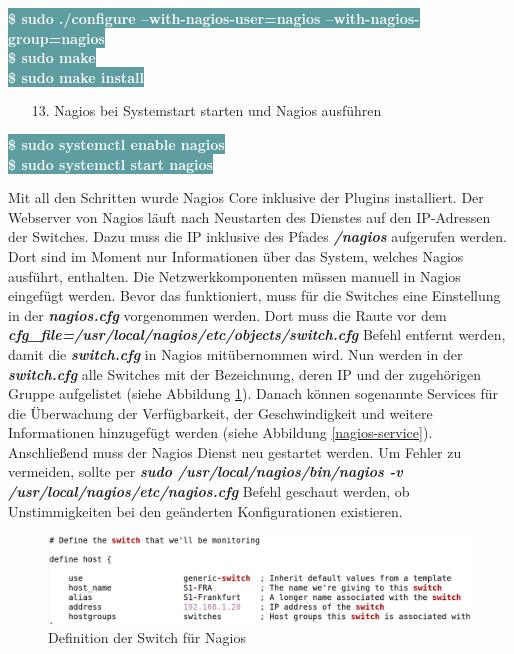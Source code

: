 \documentclass[fontsize=12pt,paper=a4,open=any,parskip=half,
  twoside=false,toc=listof,toc=bibliography,fleqn,leqno,
  captions=nooneline,captions=tableabove,british]{scrbook}
\begin{document}
\colorbox{CadetBlue}{\textcolor{white}{\textbf{\textsf{\$ sudo ./configure --with-nagios-user=nagios --with-nagios-group=nagios}}}}\\
\colorbox{CadetBlue}{\textcolor{white}{\textbf{\textsf{\$ sudo make}}}}\\
\colorbox{CadetBlue}{\textcolor{white}{\textbf{\textsf{\$ sudo make install}}}}
\begin{itemize}
\item[13.] Nagios bei Systemstart starten und Nagios ausführen
\end{itemize}
\colorbox{CadetBlue}{\textcolor{white}{\textbf{\textsf{\$ sudo systemctl enable nagios}}}}\\
\colorbox{CadetBlue}{\textcolor{white}{\textbf{\textsf{\$ sudo systemctl start nagios}}}}


Mit all den Schritten wurde Nagios Core inklusive der Plugins installiert. Der Webserver von Nagios läuft nach Neustarten des Dienstes auf den IP-Adressen der Switches. Dazu muss die IP inklusive des Pfades \textit{\textbf{/nagios}} aufgerufen werden. Dort sind im Moment nur Informationen über das System, welches Nagios ausführt, enthalten. Die Netzwerkkomponenten müssen manuell in Nagios eingefügt werden. Bevor das funktioniert, muss für die Switches eine Einstellung in der \textit{\textbf{nagios.cfg}} vorgenommen werden. Dort muss die Raute vor dem \textit{\textbf{cfg\_file=/usr/local/nagios/etc/objects/switch.cfg}} Befehl entfernt werden, damit die \textit{\textbf{switch.cfg}} in Nagios mitübernommen wird. Nun werden in der \textit{\textbf{switch.cfg}} alle Switches mit der Bezeichnung, deren IP und der zugehörigen Gruppe aufgelistet (siehe Abbildung \ref{nagios-switch}). Danach können sogenannte Services für die Überwachung der Verfügbarkeit, der Geschwindigkeit und weitere Informationen hinzugefügt werden (siehe Abbildung \ref{nagios-service}). Anschließend muss der Nagios Dienst neu gestartet werden. Um Fehler zu vermeiden, sollte per \textit{\textbf{sudo /usr/local/nagios/bin/nagios -v /usr/local/nagios/etc/nagios.cfg}} Befehl geschaut werden, ob Unstimmigkeiten bei den geänderten Konfigurationen existieren.\par

\begin{figure}[H]
 \centering
 \includegraphics[width=1.0\textwidth]{Bilder/nagios-switch}
 \captionsetup{justification=centering, margin=2cm}
 \caption{Definition der Switch für Nagios}
 \label{nagios-switch}
\end{figure}
\end{document}
